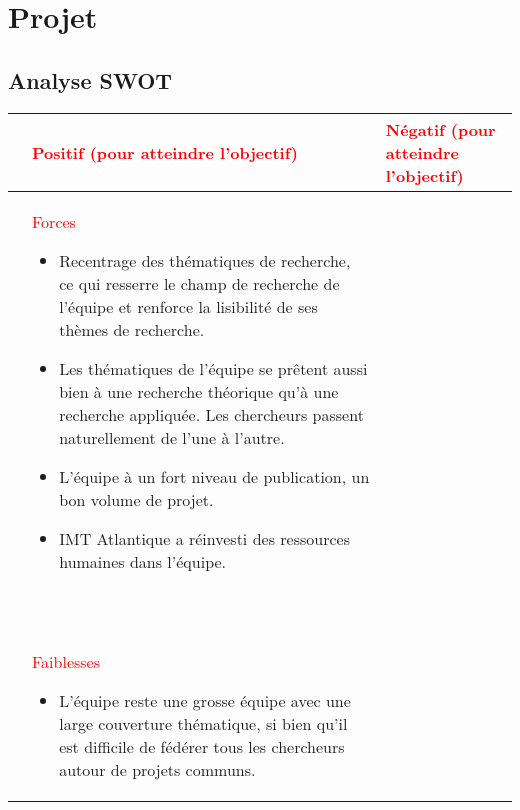 \section{Projet}
	
	
\def\slp{XXX }




		\subsection{Analyse SWOT}
		 
		 \renewcommand{\labelitemi}{$\bullet$}
		 

			\begin{table}[H]
			\begin{tabularx}{\textwidth}{|>{\centering\arraybackslash}l|>{\centering\arraybackslash}X|>{\centering\arraybackslash}X|}
			\hline
			&\textcolor{red}{Positif (pour atteindre l'objectif)} & \textcolor{red}{Négatif (pour atteindre l'objectif)}\\
			\hline
			\color{red}\parbox[t]{2mm}{} & \centering\textcolor{red}{Forces} 
			\smallskip
			\begin{itemize}
			\item  Recentrage des thématiques de recherche, ce qui resserre le champ de recherche de l'équipe et renforce la lisibilité de ses thèmes de recherche.
			\item Les thématiques de l'équipe se prêtent aussi bien à une recherche théorique qu'à une recherche appliquée. Les chercheurs passent naturellement de l'une à l'autre. 
			\item L'équipe à un fort niveau de publication, un bon volume de projet.
			\item IMT Atlantique a réinvesti des ressources humaines dans l'équipe.
			
			\end{itemize} ~\\ & \textcolor{red}{Faiblesses}
			\smallskip
			\begin{itemize}
			
			\item L'équipe reste une grosse équipe avec une large couverture thématique, si bien qu'il est difficile de fédérer tous les chercheurs autour de projets communs.
			

\end{itemize}
\end{tabularx}
\end{table}
